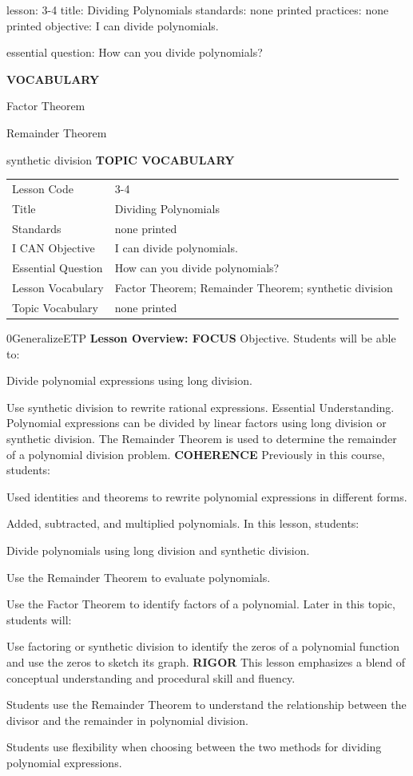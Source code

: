 \documentclass{article}
\newenvironment{lesson-meta}{}{}        %
\newenvironment{te-addendum}[2]{}{}     %
\newcommand{\te}[1]{}                   %
\begin{document}
\begin{lesson-meta}
lesson: 3-4
title: Dividing Polynomials
standards: none printed
practices: none printed
objective: I can divide polynomials.

essential question: How can you divide polynomials?

\textbf{VOCABULARY}
\item Factor Theorem
\item Remainder Theorem
\item synthetic division
\textbf{TOPIC VOCABULARY}
\te{No separate topic vocabulary list is printed on these lesson pages.}
\begin{tabular}{ll}
Lesson Code & 3-4 \\
Title & Dividing Polynomials \\
Standards & none printed \\
I CAN Objective & I can divide polynomials. \\
Essential Question & How can you divide polynomials? \\
Lesson Vocabulary & Factor Theorem; Remainder Theorem; synthetic division \\
Topic Vocabulary & none printed \\
\end{tabular}
\end{lesson-meta}
\begin{te-addendum}{0}{GeneralizeETP}
\textbf{Lesson Overview: FOCUS}
Objective. Students will be able to:
\item Divide polynomial expressions using long division.
\item Use synthetic division to rewrite rational expressions.
Essential Understanding. Polynomial expressions can be divided by linear factors using long division or synthetic division. The Remainder Theorem is used to determine the remainder of a polynomial division problem.
\textbf{COHERENCE}
Previously in this course, students:
\item Used identities and theorems to rewrite polynomial expressions in different forms.
\item Added, subtracted, and multiplied polynomials.
In this lesson, students:
\item Divide polynomials using long division and synthetic division.
\item Use the Remainder Theorem to evaluate polynomials.
\item Use the Factor Theorem to identify factors of a polynomial.
Later in this topic, students will:
\item Use factoring or synthetic division to identify the zeros of a polynomial function and use the zeros to sketch its graph.
\textbf{RIGOR}
This lesson emphasizes a blend of conceptual understanding and procedural skill and fluency.
\item Students use the Remainder Theorem to understand the relationship between the divisor and the remainder in polynomial division.
\item Students use flexibility when choosing between the two methods for dividing polynomial expressions.
\te{Program Resources. SavvasRealize.com.}
\end{te-addendum}
\end{document}
